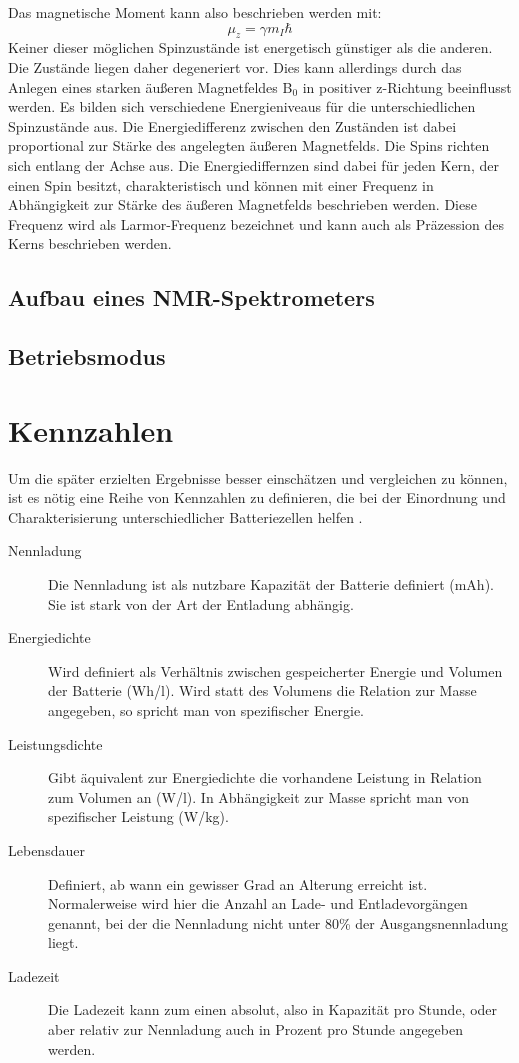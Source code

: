 \documentclass[a4paper, 11pt, headsepline,footsepline,twoside,abstract]{scrbook}
\begin{document}
Das magnetische Moment kann also beschrieben werden mit:
\begin{equation}
\mu_z = \gamma m_I \hbar
\end{equation}
Keiner dieser möglichen Spinzustände ist energetisch günstiger als die anderen. Die Zustände liegen daher degeneriert vor. Dies kann allerdings durch das Anlegen eines starken äußeren Magnetfeldes B$_0$ in positiver z-Richtung beeinflusst werden. Es bilden sich verschiedene Energieniveaus für die unterschiedlichen Spinzustände aus. Die Energiedifferenz zwischen den Zuständen ist dabei proportional zur Stärke des angelegten äußeren Magnetfelds. Die Spins richten sich entlang der Achse aus. Die Energiediffernzen sind dabei für jeden Kern, der einen Spin besitzt, charakteristisch und können mit einer Frequenz in Abhängigkeit zur Stärke des äußeren Magnetfelds beschrieben werden. Diese Frequenz wird als Larmor-Frequenz bezeichnet und kann auch als Präzession des Kerns beschrieben werden.
\subsection{Aufbau eines NMR-Spektrometers}
\subsection{Betriebsmodus}
\section{Kennzahlen}
\label{kennzahlen}
Um die später erzielten Ergebnisse besser einschätzen und vergleichen zu können, ist es nötig eine Reihe von Kennzahlen zu definieren, die bei der Einordnung und Charakterisierung unterschiedlicher Batteriezellen helfen \cite{jossen_2006}.
\begin{description}
\item[Nennladung] Die Nennladung ist als nutzbare Kapazität der Batterie definiert (mAh). Sie ist stark von der Art der Entladung abhängig.
\item[Energiedichte] Wird definiert als Verhältnis zwischen gespeicherter Energie und Volumen der Batterie (Wh/l). Wird statt des Volumens die Relation zur Masse angegeben, so spricht man von spezifischer Energie. 
\item[Leistungsdichte] Gibt äquivalent zur Energiedichte die vorhandene Leistung in Relation zum Volumen an (W/l). In Abhängigkeit zur Masse spricht man von spezifischer Leistung (W/kg).
\item[Lebensdauer] Definiert, ab wann ein gewisser Grad an Alterung erreicht ist. Normalerweise wird hier die Anzahl an Lade- und  Entladevorgängen genannt, bei der die Nennladung nicht unter 80\% der Ausgangsnennladung liegt.
\item[Ladezeit] Die Ladezeit kann zum einen absolut, also in Kapazität pro Stunde, oder aber relativ zur Nennladung auch in Prozent pro Stunde angegeben werden.
\end{description}
\end{document}
